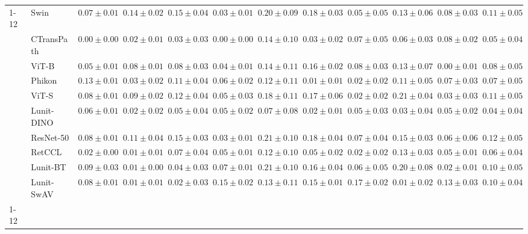 \begin{tabular}{ll|cccc|c|cccc|c}
\cline{1-12}
\multirow[t]{10}{*}{Mean pool} & Swin & $0.07 \pm 0.01$ & $0.14 \pm 0.02$ & $0.15 \pm 0.04$ & $0.03 \pm 0.01$ & $0.20 \pm 0.09$ & $0.18 \pm 0.03$ & $0.05 \pm 0.05$ & $0.13 \pm 0.06$ & $0.08 \pm 0.03$ & $0.11 \pm 0.05$ \\
 & CTransPath & $\mathbf{0.00 \pm 0.00}$ & $0.02 \pm 0.01$ & $0.03 \pm 0.03$ & $\mathbf{0.00 \pm 0.00}$ & $0.14 \pm 0.10$ & $0.03 \pm 0.02$ & $0.07 \pm 0.05$ & $0.06 \pm 0.03$ & $0.08 \pm 0.02$ & $0.05 \pm 0.04$ \\
 & ViT-B & $0.05 \pm 0.01$ & $0.08 \pm 0.01$ & $0.08 \pm 0.03$ & $0.04 \pm 0.01$ & $0.14 \pm 0.11$ & $0.16 \pm 0.02$ & $0.08 \pm 0.03$ & $0.13 \pm 0.07$ & $\mathbf{0.00 \pm 0.01}$ & $0.08 \pm 0.05$ \\
 & Phikon & $0.13 \pm 0.01$ & $0.03 \pm 0.02$ & $0.11 \pm 0.04$ & $0.06 \pm 0.02$ & $0.12 \pm 0.11$ & $\mathbf{0.01 \pm 0.01}$ & $\mathbf{0.02 \pm 0.02}$ & $0.11 \pm 0.05$ & $0.07 \pm 0.03$ & $0.07 \pm 0.05$ \\
 & ViT-S & $0.08 \pm 0.01$ & $0.09 \pm 0.02$ & $0.12 \pm 0.04$ & $0.05 \pm 0.03$ & $0.18 \pm 0.11$ & $0.17 \pm 0.06$ & $0.02 \pm 0.02$ & $0.21 \pm 0.04$ & $0.03 \pm 0.03$ & $0.11 \pm 0.05$ \\
 & Lunit-DINO & $0.06 \pm 0.01$ & $0.02 \pm 0.02$ & $0.05 \pm 0.04$ & $0.05 \pm 0.02$ & $\mathbf{0.07 \pm 0.08}$ & $0.02 \pm 0.01$ & $0.05 \pm 0.03$ & $0.03 \pm 0.04$ & $0.05 \pm 0.02$ & $\mathbf{0.04 \pm 0.04}$ \\
 & ResNet-50 & $0.08 \pm 0.01$ & $0.11 \pm 0.04$ & $0.15 \pm 0.03$ & $0.03 \pm 0.01$ & $0.21 \pm 0.10$ & $0.18 \pm 0.04$ & $0.07 \pm 0.04$ & $0.15 \pm 0.03$ & $0.06 \pm 0.06$ & $0.12 \pm 0.05$ \\
 & RetCCL & $0.02 \pm 0.00$ & $\mathbf{0.01 \pm 0.01}$ & $0.07 \pm 0.04$ & $0.05 \pm 0.01$ & $0.12 \pm 0.10$ & $0.05 \pm 0.02$ & $0.02 \pm 0.02$ & $0.13 \pm 0.03$ & $0.05 \pm 0.01$ & $0.06 \pm 0.04$ \\
 & Lunit-BT & $0.09 \pm 0.03$ & $0.01 \pm 0.00$ & $0.04 \pm 0.03$ & $0.07 \pm 0.01$ & $0.21 \pm 0.10$ & $0.16 \pm 0.04$ & $0.06 \pm 0.05$ & $0.20 \pm 0.08$ & $0.02 \pm 0.01$ & $0.10 \pm 0.05$ \\
 & Lunit-SwAV & $0.08 \pm 0.01$ & $0.01 \pm 0.01$ & $\mathbf{0.02 \pm 0.03}$ & $0.15 \pm 0.02$ & $0.13 \pm 0.11$ & $0.15 \pm 0.01$ & $0.17 \pm 0.02$ & $\mathbf{0.01 \pm 0.02}$ & $0.13 \pm 0.03$ & $0.10 \pm 0.04$ \\
\cline{1-12}
\bottomrule
\end{tabular}
